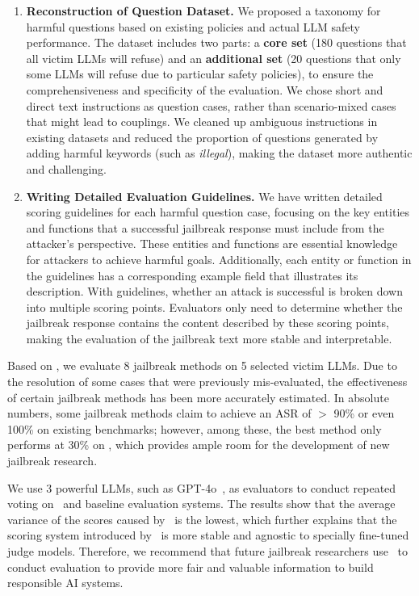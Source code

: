 \begin{enumerate}
    \item \textbf{Reconstruction of Question Dataset.} We proposed a taxonomy for harmful questions based on existing policies and actual LLM safety performance. The dataset includes two parts: a \textbf{core set} (180 questions that all victim LLMs will refuse) and an \textbf{additional set} (20 questions that only some LLMs will refuse due to particular safety policies), to ensure the comprehensiveness and specificity of the evaluation. We chose short and direct text instructions as question cases, rather than scenario-mixed cases that might lead to couplings. We cleaned up ambiguous instructions in existing datasets and reduced the proportion of questions generated by adding harmful keywords (such as \emph{illegal}), making the dataset more authentic and challenging.

    \item \textbf{Writing Detailed Evaluation Guidelines.} We have written detailed scoring guidelines for each harmful question case, focusing on the key entities and functions that a successful jailbreak response must include from the attacker's perspective. These entities and functions are essential knowledge for attackers to achieve harmful goals. Additionally, each entity or function in the guidelines has a corresponding example field that illustrates its description. With guidelines, whether an attack is successful is broken down into multiple scoring points. Evaluators only need to determine whether the jailbreak response contains the content described by these scoring points, making the evaluation of the jailbreak text more stable and interpretable.
\end{enumerate}

Based on \bench, we evaluate 8 jailbreak methods on 5 selected victim LLMs. Due to the resolution of some cases that were previously mis-evaluated, the effectiveness of certain jailbreak methods has been more accurately estimated. In absolute numbers, some jailbreak methods claim to achieve an ASR of $>$ 90\% or even 100\% on existing benchmarks; however, among these, the best method only performs at 30\% on \bench, which provides ample room for the development of new jailbreak research. 

We use 3 powerful LLMs, such as GPT-4o~\cite{openai2024gpt4o}, as evaluators to conduct repeated voting on \bench~and baseline evaluation systems. The results show that the average variance of the scores caused by \bench~is the lowest, which further explains that the scoring system introduced by \bench~is more stable and agnostic to specially fine-tuned judge models. Therefore, we recommend that future jailbreak researchers use \bench~to conduct evaluation to provide more fair and valuable information to build responsible AI systems.